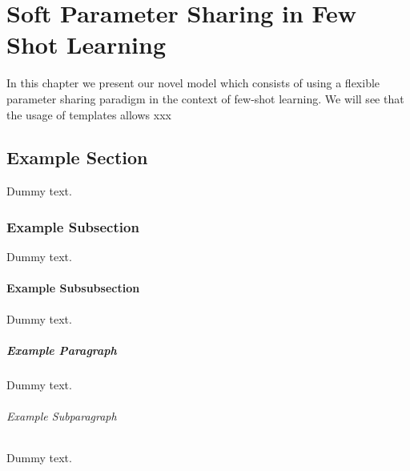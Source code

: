 \chapter{Soft Parameter Sharing in Few Shot Learning}

In this chapter we present our novel model which consists of using a flexible parameter sharing paradigm in the context of few-shot learning. We will see that the usage of templates allows xxx 

\section{Example Section}

Dummy text.

\subsection{Example Subsection}

Dummy text.

\subsubsection{Example Subsubsection}

Dummy text.

\paragraph{Example Paragraph}

Dummy text.

\subparagraph{Example Subparagraph}

Dummy text.
